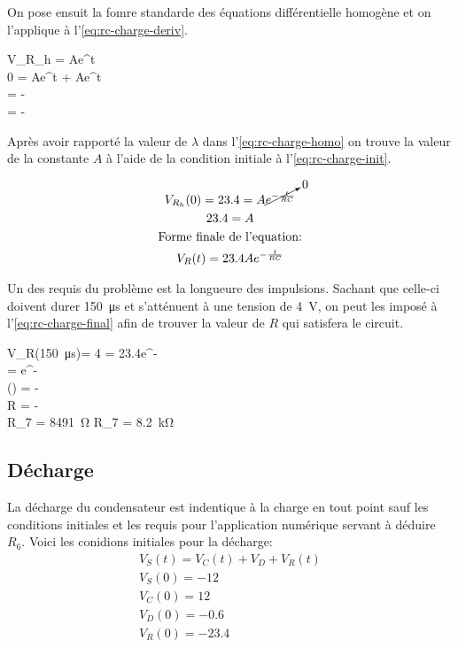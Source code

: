 \documentclass[a11paper, 11pt]{article}
\newcommand{\vct}{V_C(t)}
\newcommand{\vrt}{V_R(t)}
\newcommand{\vst}{V_S(t)}
\newcommand{\la}{\lambda}
\begin{document}
\begin{appendix}
	On pose ensuit la fomre standarde des équations différentielle homogène et
	on l'applique à l'\cref{eq:rc-charge-deriv}.
	\begin{DispWithArrows}[format=c]
		V_{R_h} = Ae^{\la t}  \label{eq:rc-charge-homo}\\
		0 = \la Ae^{\la t} + Ae^{\la t}\\
		\la\cancelto{1}{Ae^{\la t}} = -\cancelto{1}{Ae^{\la t}}\\
		\la = -
	\end{DispWithArrows}

	Après avoir rapporté la valeur de $\la$ dans l'\cref{eq:rc-charge-homo} on trouve la valeur
	de la constante $A$ à l'aide de la condition initiale à l'\cref{eq:rc-charge-init}.

	\begin{gather}
		V_{R_h}(0) = 23.4 = A\cancelto{0}{e^{-\frac{t}{RC}}}\\
		23.4 = A\\
		\nonumber\text{Forme finale de l'equation:}\\
		\vrt = 23.4Ae^{-\frac{t}{RC}} \label{eq:rc-charge-final}
	\end{gather}

	Un des requis du problème est la longueure des impulsions.
	Sachant que celle-ci doivent durer \SI{150}{\us} et s'atténuent à une tension de \SI{4}{\V},
	on peut les imposé à l'\cref{eq:rc-charge-final} afin de trouver la valeur de $R$ qui
	satisfera le circuit.

	\begin{DispWithArrows}[format=c]
		V_R(\SI{150}{\us})= 4 = 23.4e^{-}\\
		 = e^{-}\\
		\ln() = -\\
		R = - \\
		R_7 = \SI{8491}{\ohm}  R_7 = \SI{8.2}{\kohm}
	\end{DispWithArrows}

	\subsection{Décharge} \label{sc:rc-decharge}
	La décharge du condensateur est indentique à la charge en tout point sauf
	les conditions initiales et les requis pour l'application numérique servant à
	déduire $R_6$.
	Voici les conidions initiales pour la décharge:
	\begin{gather}
		\vst = \vct + V_D + \vrt \label{eq:rc-decharge-base}\\
		V_S(0) = -12\\
		V_C(0) = 12\\
		V_D(0) = -0.6\\
		V_R(0) = -23.4 \label{eq:rc-decharge-init}\\
	\end{gather}


\end{appendix}
\end{document}
